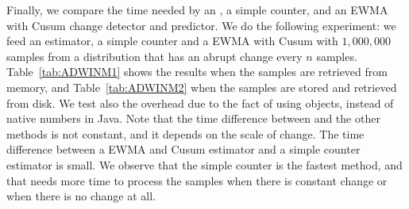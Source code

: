 Finally, we compare the time needed by an \adwintwoz, a simple counter, and an EWMA with Cusum change detector and predictor.
We do the following experiment: we feed an \adwintwo estimator, a simple counter and a EWMA with Cusum with $1,000,000$ samples from a distribution
that has an abrupt change every $n$ samples. 
 Table~\ref{tab:ADWINM1} shows the results when the samples are retrieved from memory, and  Table~\ref{tab:ADWINM2} when the samples are stored and retrieved from disk. We test also the overhead due to the fact of using objects, instead of native numbers in Java.
Note that the time difference between \adwintwo and the other methods is not constant, and it depends on the scale of change. The time difference between a EWMA and Cusum estimator and a simple counter estimator is small.
We observe that the simple counter is the fastest method, and that \adwintwo needs more time to process the samples when there is constant change or when there is no change at all.



